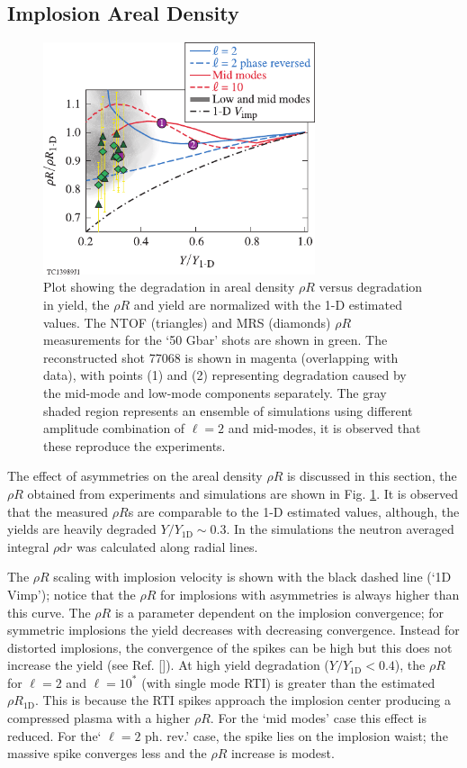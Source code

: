\documentclass[aip,reprint]{revtex4-1}
\begin{document}
\subsection{Implosion Areal Density}
\label{sec:Exp_rhoR}
%
%
%
\begin{figure}
\includegraphics[width=80mm]{Fig14_Bose}
\caption{\label{fig:Exp_rhoR} Plot showing the degradation in areal density $\rho R$ versus degradation in yield, the $\rho R$ and yield are normalized with the 1-D estimated values. The NTOF (triangles) and MRS (diamonds) $\rho R$ measurements for the `50 Gbar' shots are shown in green. The reconstructed shot 77068 is shown in magenta (overlapping with data), with points (1) and (2) representing degradation caused by the mid-mode and low-mode components separately. The gray shaded region represents an ensemble of simulations using different amplitude combination of $\ell=2$ and mid-modes, it is observed that these reproduce the experiments.}
\end{figure}
%
%
%
%
 The effect of asymmetries on the areal density $\rho R$ is discussed in this section, the $\rho R$ obtained from experiments and simulations are shown in Fig. \ref{fig:Exp_rhoR}. It is observed that the measured $\rho R$s are comparable to the 1-D estimated values, although, the yields are heavily degraded $Y/Y_\text{1D} \sim 0.3$. In the simulations the neutron averaged integral $\rho \text{d}r$ was calculated along radial lines.

 The $\rho R$ scaling with implosion velocity is shown with the black dashed line (`1D Vimp'); %
notice that the $\rho R$ for implosions with asymmetries is always higher than this curve. The $\rho R$ is a parameter dependent on the implosion convergence; for symmetric implosions the yield decreases with decreasing convergence. Instead for distorted implosions, the convergence of the spikes can be high but this does not increase the yield (see Ref. []). At high yield degradation ($Y/Y_\text{1D} < 0.4$), the $\rho R$ for $\ell =2$ and $\ell=10^*$ (with single mode RTI) is greater than the estimated $\rho R_\text{1D}$. This is because the RTI spikes approach the implosion center producing a compressed plasma with a higher $\rho R$. For the `mid modes' case this effect is reduced. For the` $\ell=2$ ph. rev.' case, the spike lies on the implosion waist; the massive spike converges less and the $\rho R$ increase is modest. 
\end{document}
